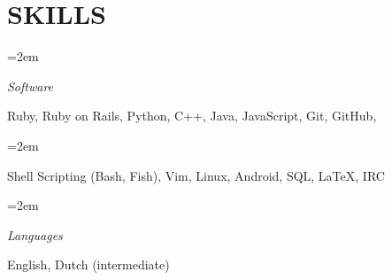 \documentclass[paper=a4,fontsize=11pt]{scrartcl} %
\newlength{\spacebox}
\newcommand{\sepspace}{\vspace*{1em}}     %
\newcommand{\NewPart}[1]{\section*{\uppercase{#1}}}
\newcommand{\PersonalEntry}[2]{
    \noindent\hangindent=2em\hangafter=0  %
    \parbox{\spacebox}{                   %
    \textit{#1}}                          %
    \hspace{1.5em} #2 \par}               %
\newcommand{\SkillsEntry}[2]{             %
    \noindent\hangindent=2em\hangafter=0  %
    \parbox{\spacebox}{                   %
    \textit{#1}}                          %
    \hspace{1.5em} #2 \par}               %
\begin{document}

\NewPart{Skills}{}

\SkillsEntry{Software}{Ruby, Ruby on Rails, Python, C++, Java, JavaScript, Git, GitHub,}
\SkillsEntry{}{Shell Scripting (Bash, Fish), Vim, Linux, Android, SQL, \LaTeX, IRC}
\sepspace
\SkillsEntry{Languages}{English, Dutch (intermediate)}

\end{document}
